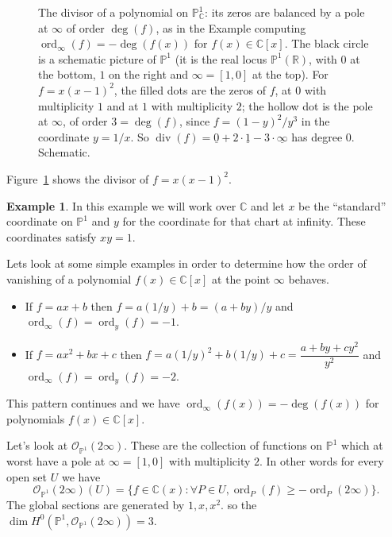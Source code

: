 \documentclass[12pt]{article}
\numberwithin{equation}{section}
\theoremstyle{definition}
\newtheorem{example}[theorem]{Example}
\theoremstyle{remark}
\newcommand{\RR}{\mathbb{R}}
\newcommand{\CC}{\mathbb{C}}
\newcommand{\Ocal}{\mathcal{O}}
\newcommand{\PP}{\mathbb{P}}
\newcommand{\ord}{\operatorname{ord}}
\renewcommand{\div}{\operatorname{div}}
\begin{document}
\begin{figure}[H]
\centering

\caption{The divisor of a polynomial on $\PP^1_{\CC}$: its zeros are balanced by a pole at $\infty$ of order $\deg(f)$, as in the Example computing $\ord_{\infty}(f)=-\deg(f(x))$ for $f(x)\in\CC[x]$. The black circle is a schematic picture of $\PP^1$ (it is the real locus $\PP^1(\RR)$, with $0$ at the bottom, $1$ on the right and $\infty=[1,0]$ at the top). For $f=x(x-1)^2$, the filled dots are the zeros of $f$, at $0$ with multiplicity $1$ and at $1$ with multiplicity $2$; the hollow dot is the pole at $\infty$, of order $3=\deg(f)$, since $f=(1-y)^2/y^3$ in the coordinate $y=1/x$. So $\div(f)=\underline{0}+2\cdot\underline{1}-3\cdot\underline{\infty}$ has degree $0$. Schematic.}\label{fig:divisor-on-p1}
\end{figure}
Figure~\ref{fig:divisor-on-p1} shows the divisor of $f=x(x-1)^2$.

\begin{example}
	In this example we will work over $\CC$ and let $x$ be the ``standard'' coordinate on $\PP^1$ and $y$ for the coordinate for that chart at infinity. 
	These coordinates satisfy $xy=1$.
	
	Lets look at some simple examples in order to determine how the order of vanishing of a polynomial $f(x) \in \CC[x]$ at the point $\infty$ behaves. 
	\begin{itemize}
		\item If $f=ax+b$ then $f = a(1/y)+b = (a+by)/y$ and $\ord_{\infty}(f)=\ord_y(f)=-1$.
		\item If $f=ax^2+bx+c$ then $f=a(1/y)^2+b(1/y)+c = \dfrac{a+by+cy^2}{y^2}$ and $\ord_{\infty}(f) = \ord_y(f) = -2$.
	\end{itemize}
 This pattern continues and we have $\ord_{\infty}(f(x)) = -\deg(f(x))$ for polynomials $f(x) \in \CC[x].$
	
	
	Let's look at $\Ocal_{\PP^1}(2\infty)$. 
	These are the collection of functions on $\PP^1$ which at worst have a pole at $\infty = [1,0]$ with multiplicity $2$.
	In other words for every open set $U$ we have 
	$$ \Ocal_{\PP^1}(2\infty)(U) = \lbrace f \in \CC(x) \colon \forall P \in U, \ord_P(f) \geq -\ord_P(2\infty) \rbrace.$$
	The global sections are generated by $1, x, x^2.$
	so the $\dim H^0(\PP^1,\Ocal_{\PP^1}(2\infty))=3$.
\end{example}
\end{document}

